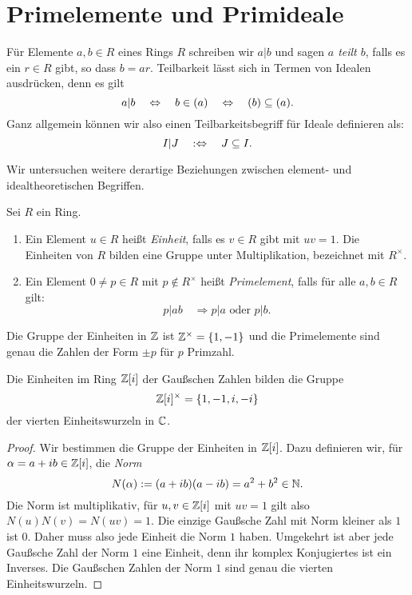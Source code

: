 \documentclass{book}
\begin{document}
\section{Primelemente und Primideale}%
\label{sec:primideale}

Für Elemente $a,b \in R$ eines Rings $R$ schreiben wir $a|b$ und sagen {\em
$a$ teilt $b$}, falls es ein $r \in R$ gibt, so dass $b = a r$. Teilbarkeit
lässt sich in Termen von Idealen ausdrücken, denn es gilt
\[
    a | b \quad \Leftrightarrow \quad b \in (a) \quad \Leftrightarrow \quad (b) \subseteq (a).
\]
Ganz allgemein können wir also einen Teilbarkeitsbegriff für Ideale definieren als:
\[
    I | J \quad : \Leftrightarrow \quad J \subseteq I.
\]

Wir untersuchen weitere derartige Beziehungen zwischen element- und idealtheoretischen
Begriffen.

\begin{term}
    \label{term:einheitprim}
    Sei $R$ ein Ring. 
    \begin{enumerate}
        \item {}Ein Element $u \in R$ heißt \emph{Einheit}, falls es $v \in R$
            gibt mit $uv =1$. Die Einheiten von $R$ bilden eine Gruppe unter
            Multiplikation, bezeichnet mit $R^{\times}$. 
        \item {}Ein Element $0 \neq p \in R$ mit $p \notin R^{\times}$ heißt
            \emph{Primelement}, falls für alle $a,b \in R$ gilt: 
            \[
                p|ab \quad \Rightarrow \text{$p|a$ oder $p|b$}. 
            \]
    \end{enumerate}
\end{term}

\begin{exa}
        Die Gruppe der Einheiten in $\mathbb{Z}$ ist $\mathbb{Z}^{\times} = \{1, -1 \}$ und
        die Primelemente sind genau die Zahlen der Form $\pm p$ für $p$
        Primzahl.
\end{exa}

\begin{prop}
    \label{prop:gausseinheiten}
    Die Einheiten im Ring $\mathbb{Z}[i]$ der Gaußschen Zahlen bilden die Gruppe
    \[
        \mathbb{Z}[i]^{\times} = \{1, -1, i, -i \}
    \]
    der vierten Einheitswurzeln in $\mathbb{C}$.
\end{prop}
\begin{proof}
    Wir bestimmen die Gruppe der Einheiten in $\mathbb{Z}[i]$. Dazu definieren wir, für $\alpha = a+ib \in \mathbb{Z}[i]$, die \emph{Norm} 
        \[
            N(\alpha) := (a + i b) (a - i b) = a^2 + b^2 \in \mathbb{N}.
        \]
        Die Norm ist multiplikativ, für $u,v \in \mathbb{Z}[i]$ mit $uv = 1$ gilt
        also $N(u)N(v) = N(uv) = 1$. Die einzige Gaußsche Zahl mit Norm
        kleiner als $1$ ist $0$. Daher muss also jede Einheit die Norm $1$
        haben. Umgekehrt ist aber jede Gaußsche Zahl der Norm $1$ eine
        Einheit, denn ihr komplex Konjugiertes ist ein Inverses. Die Gaußschen
        Zahlen der Norm $1$ sind genau die vierten Einheitswurzeln.
\end{proof}
\end{document}
